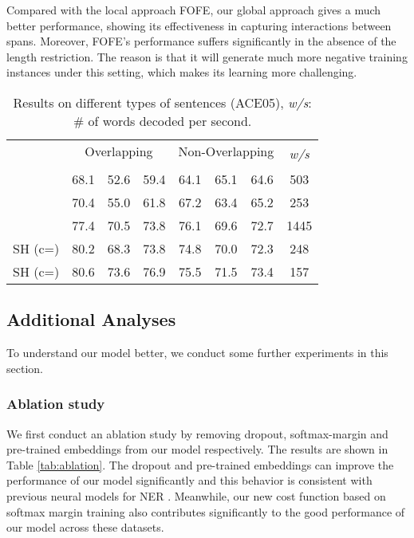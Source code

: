 \documentclass[11pt,a4paper]{article}
\theoremstyle{theorem}
\begin{document}
Compared with the local approach FOFE, our global approach gives a much better performance, showing its effectiveness in capturing interactions between spans.
Moreover, FOFE's performance suffers significantly in the absence of the length restriction. The reason is that it will generate much more negative training instances under this setting, which makes its learning more challenging.


\begin{table}[t!]
\centering
\scalebox{0.68}
{
\begin{tabular}{l|ccc|ccc|c}
    & \multicolumn{3}{c|}{{Overlapping}} & \multicolumn{3}{c|}{{Non-Overlapping}} &\multirow{2}{*}{{\em w/s}}    \\ 
             & &  &  &  &  &   &   \\ 
 \hline
\citet{lu2015joint}         &    68.1   &  52.6 & 59.4    & 64.1  &  65.1 & 64.6 & 503   \\
\citet{muis2017labeling}          & 70.4  &  55.0 & 61.8    & 67.2   &  63.4 & 65.2  & 253     \\
\citet{nest-bw-em18} & 77.4 & 70.5 &  73.8 & 76.1 & 69.6 &  72.7 & 1445 \\ 
\hline

 SH (c=)  & 80.2 & 68.3 & 73.8 & 74.8 & 70.0 & 72.3    &  248  \\
 SH (c=)  & 80.6 & 73.6 & 76.9 & 75.5 & 71.5 & 73.4   &  157    \\
 
\end{tabular}
}
\caption{Results on different types of sentences (ACE05), {\em w/s}: \# of words decoded per second.}
\label{tab:overlap}
\end{table}

\subsection{Additional Analyses}


To understand our model better, we conduct some further experiments in this section. 

\subsubsection*{Ablation study}



We first conduct an ablation study by removing dropout, softmax-margin and pre-trained embeddings from our model respectively.
The results are shown in Table \ref{tab:ablation}.
The dropout and pre-trained embeddings can improve the {\color{black}performance} of our model significantly and this behavior is consistent with previous neural models for NER \cite{chiu2016named,lample2016neural}.
Meanwhile, our new cost function based on softmax margin training also contributes significantly to the good performance of our model across these datasets.
\end{document}
